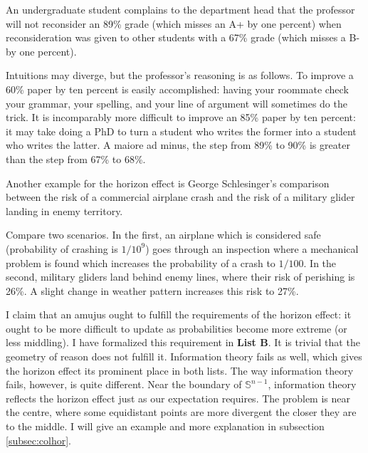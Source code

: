 \documentclass[12pt]{article}
\begin{document}
\begin{quotex}
  \label{ex:complaint} An
  undergraduate student complains to the department head that the
  professor will not reconsider an 89\% grade (which misses an A+ by
  one percent) when reconsideration was given to other students with a
  67\% grade (which misses a B- by one percent).
\end{quotex}

Intuitions may diverge, but the professor's reasoning is as follows.
To improve a 60\% paper by ten percent is easily accomplished: having
your roommate check your grammar, your spelling, and your line of
argument will sometimes do the trick. It is incomparably more
difficult to improve an 85\% paper by ten percent: it may take doing a
PhD to turn a student who writes the former into a student who writes
the latter. A maiore ad minus, the step from 89\% to 90\% is greater
than the step from 67\% to 68\%.

Another example for the horizon effect is George Schlesinger's
comparison between the risk of a commercial airplane crash and the
risk of a military glider landing in enemy territory.

\begin{quotex}
  \label{ex:schlesinger} Compare two
  scenarios. In the first, an airplane which is considered safe
  (probability of crashing is $1/10^{9}$) goes through an
  inspection where a mechanical problem is found which increases
  the probability of a crash to $1/100$. In the second, military
  gliders land behind enemy lines, where their risk of perishing
  is 26\%. A slight change in weather pattern increases this risk
  to 27\%. 
\end{quotex}

I claim that an amujus ought to fulfill the requirements of the
horizon effect: it ought to be more difficult to update as
probabilities become more extreme (or less middling). I have
formalized this requirement in \textbf{List B}. It is trivial that the
geometry of reason does not fulfill it. Information theory fails as
well, which gives the horizon effect its prominent place in both
lists. The way information theory fails, however, is quite different.
Near the boundary of $\mathbb{S}^{n-1}$, information theory reflects
the horizon effect just as our expectation requires. The problem is
near the centre, where some equidistant points are more divergent the
closer they are to the middle. I will give an example and more
explanation in subsection \ref{subsec:colhor}.
\end{document}
